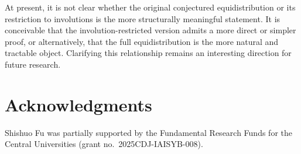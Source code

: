 \documentclass[12pt]{article}
\begin{document}
At present, it is not clear whether the original conjectured equidistribution or its restriction to involutions is the more structurally meaningful statement. It is conceivable that the involution-restricted version admits a more direct or simpler proof, or alternatively, that the full equidistribution is the more natural and tractable object. Clarifying this relationship remains an interesting direction for future research.



\section*{\bf Acknowledgments}
 Shishuo Fu was partially supported by the Fundamental Research Funds for the Central Universities (grant no.~2025CDJ-IAISYB-008).
\end{document}
